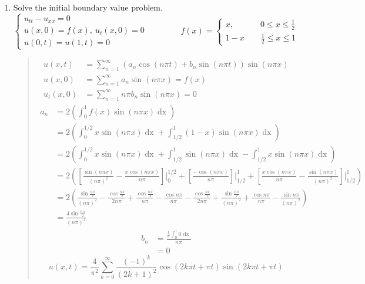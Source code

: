\documentclass{article}
\newcommand{\beq}{\begin{quote}}
\newcommand{\eeq}{\end{quote}}
\newcommand{\dx}{\mathop{dx}}
\begin{document}
\begin{enumerate}
\item Solve the initial boundary value problem.
\[
\begin{cases*}
u_{tt} - u_{xx} = 0\\
u(x,0) = f(x),\ u_{t}(x,0) = 0\\
u(0,t) = u(1,t) = 0
\end{cases*}
\qquad\qquad
f(x) =
\begin{cases*}
x,\qquad\quad\ 0\leq x\leq\frac{1}{2}\\
1- x\qquad \frac{1}{2}\leq x\leq 1
\end{cases*}
\]
\beq
\begin{align*}
u(x,t) &= \sum_{n=1}^{\infty}(a_{n}\cos{(n\pi t)} + b_{n}\sin{(n\pi t)})\sin{(n\pi x)}\\
u(x,0) &= \sum_{n=1}^{\infty}a_{n}\sin{(n\pi x)} = f(x)\\
u_{t}(x,0) &= \sum_{n=1}^{\infty}n\pi b_{n}\sin{(n\pi x)} = 0
\end{align*}
\begin{align*}
a_{n} &= 2\left(\int_{0}^{1}f(x)\sin{(n\pi x)}\dx\right)\\
&= 2\left(\int_{0}^{1/2}x\sin{(n\pi x)}\dx + \int_{1/2}^{1}(1-x)\sin{(n\pi x)}\dx\right)\\
&= 2\left(\int_{0}^{1/2}x\sin{(n\pi x)}\dx + \int_{1/2}^{1}\sin{(n\pi x)}\dx - \int_{1/2}^{1}x\sin{(n\pi x)}\dx\right)\\
&= 2\left(\left[\frac{\sin{(n\pi x)}}{(n\pi)^{2}} - \frac{x\cos{(n\pi x)}}{n\pi}\right]\Bigg|_{0}^{1/2} + \left[ \frac{-\cos{(n\pi x)}}{n\pi}\right]\Bigg|_{1/2}^{1} + \left[\frac{x\cos{(n\pi x)}}{n\pi} - \frac{\sin{(n\pi x)}}{(n\pi)^2}\right]\Bigg|_{1/2}^{1}\right)\\
&= 2\left(\frac{\sin{\frac{n\pi}{2}}}{(n\pi)^2} - \frac{\cos{\frac{n\pi}{2}}}{2n\pi} + \frac{\cos{\frac{n\pi}{2}}}{n\pi} - \frac{\cos{n\pi}}{n\pi} - \frac{\cos{\frac{n\pi}{2}}}{2n\pi} + \frac{\sin{\frac{n\pi}{2}}}{(n\pi)^{2}} + \frac{\cos{n\pi}}{n\pi} - \frac{\sin{n\pi}}{(n\pi)^{2}}\right)\\
&= \frac{4\sin{\frac{n\pi}{2}}}{(n\pi)^{2}}
\end{align*}
\begin{align*}
b_{n} &= \frac{\frac{1}{\pi}\int_{0}^{1}0\dx}{n\pi}\\
&= 0
\end{align*}
\[
u(x,t) = \frac{4}{\pi^{2}}\sum_{k=0}^{\infty}\frac{(-1)^{k}}{(2k+1)^{2}}\cos{(2k\pi t + \pi t)}\sin{(2k\pi t + \pi t)}
\]
\eeq



\end{enumerate}
\end{document}
